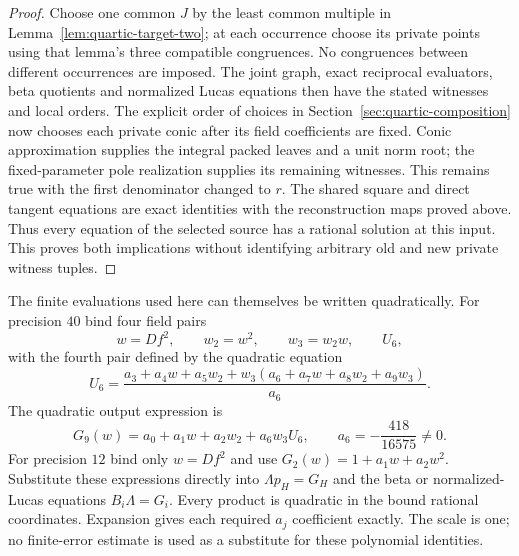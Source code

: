 \begin{proof}
Choose one common $J$ by the least common multiple in
Lemma~\ref{lem:quartic-target-two}; at each occurrence choose its private
points using that lemma's three compatible congruences. No congruences
between different occurrences are imposed. The joint graph, exact
reciprocal evaluators, beta quotients and normalized Lucas equations then
have the stated witnesses and local orders. The explicit order of choices
in Section~\ref{sec:quartic-composition} now chooses each private conic
after its field coefficients are fixed. Conic approximation supplies the
integral packed leaves and a unit norm root; the fixed-parameter pole
realization supplies its remaining witnesses. This remains true with the
first denominator changed to $r$. The shared square and direct tangent
equations are exact identities with the reconstruction maps proved above.
Thus every equation of the selected source has a rational solution at
this input. This proves both implications without identifying arbitrary
old and new private witness tuples.
\end{proof}

The finite evaluations used here can themselves be written quadratically.
For precision $40$ bind four field pairs
\[
 w=Df^2,\qquad w_2=w^2,\qquad w_3=w_2w,\qquad U_6,
\]
with the fourth pair defined by the quadratic equation
\[
 U_6=\frac{a_3+a_4w+a_5w_2+
                  w_3(a_6+a_7w+a_8w_2+a_9w_3)}{a_6}.
\]
The quadratic output expression is
\[
 G_9(w)=a_0+a_1w+a_2w_2+a_6w_3U_6,
 \qquad a_6=-\frac{418}{16575}\ne0.
\]
For precision $12$ bind only $w=Df^2$ and use
$G_2(w)=1+a_1w+a_2w^2$. Substitute these expressions directly into
$\Lambda p_H=G_H$ and the beta or normalized-Lucas equations $B_i\Lambda=G_i$. Every product is quadratic in
the bound rational coordinates. Expansion gives each required $a_j$
coefficient exactly. The scale is one; no finite-error estimate is used
as a substitute for these polynomial identities.
